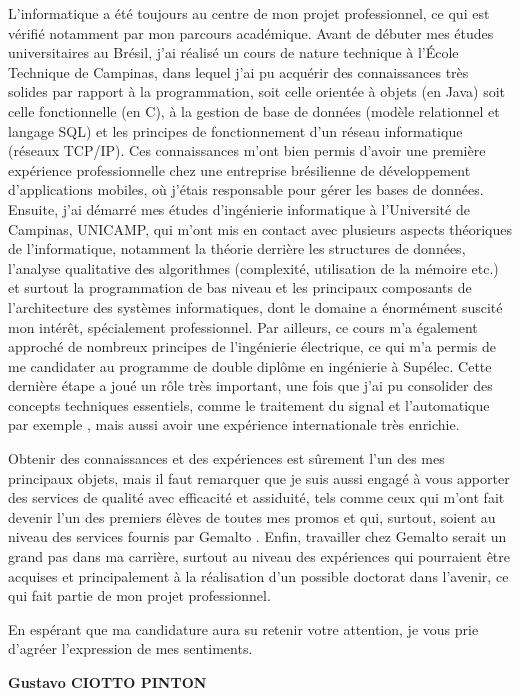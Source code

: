 \documentclass[12pt, a4paper]{article}
\newcommand{\entreprise}{Gemalto }
\begin{document}
\vspace{12pt}

L'informatique a été toujours au centre de mon projet professionnel, ce qui est
vérifié notamment par mon parcours académique. Avant de débuter mes études
universitaires au Brésil, j'ai réalisé un cours de nature technique à l'École
Technique de Campinas, dans lequel j'ai pu acquérir des connaissances très
solides par rapport à la programmation, soit celle orientée à objets (en Java)
soit celle fonctionnelle (en C), à la gestion de base de données (modèle
relationnel et langage SQL) et les principes de fonctionnement d'un réseau
informatique (réseaux TCP/IP). Ces connaissances m'ont bien permis d'avoir une
première expérience professionnelle chez une entreprise brésilienne de
développement d'applications mobiles, où j'étais responsable pour gérer les
bases de données. Ensuite, j'ai démarré mes études d'ingénierie informatique à
l'Université de Campinas, UNICAMP, qui m'ont mis en contact avec plusieurs
aspects théoriques de l’informatique, notamment la théorie derrière les 
structures de données, l'analyse qualitative des algorithmes (complexité,
utilisation de la mémoire etc.) et surtout la programmation de bas niveau et les
principaux composants de l'architecture des systèmes informatiques, dont le
domaine a énormément suscité mon intérêt, spécialement professionnel. Par
ailleurs, ce cours m'a également approché de nombreux principes de
l'ingénierie électrique, ce qui m'a permis de me candidater au programme de
double diplôme en ingénierie à Supélec. Cette dernière étape a joué un rôle
très important, une fois que j'ai pu consolider des concepts techniques
essentiels, comme le traitement du signal et l'automatique par exemple , mais
aussi avoir une expérience internationale très enrichie.

\vspace{12pt}

Obtenir des connaissances et des expériences est sûrement l'un des mes
principaux objets, mais il faut remarquer que je suis aussi engagé à
vous apporter des services de qualité avec efficacité et assiduité, tels comme
ceux qui m'ont fait devenir l'un des premiers élèves de toutes mes promos
et qui, surtout, soient au niveau des services fournis par \entreprise. Enfin,
travailler chez \entreprise serait un grand pas dans ma carrière, surtout au
niveau des expériences qui pourraient être acquises et principalement à la
réalisation d'un possible doctorat dans l'avenir, ce qui fait partie de mon
projet professionnel.

\vspace{12pt}

En espérant que ma candidature aura su retenir votre attention, je vous prie
d'agréer l'expression de mes sentiments.

\vspace{12pt}

\textbf{Gustavo CIOTTO PINTON}
\end{document}
